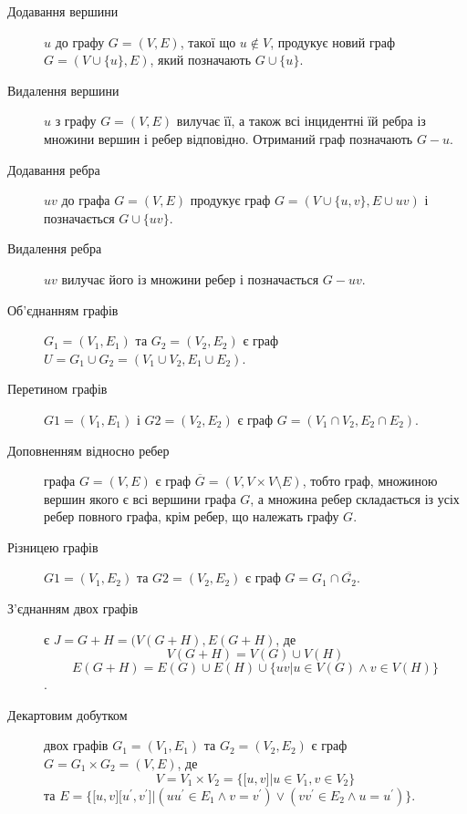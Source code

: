 \begin{description}
\item[Додавання вершини] $u$ до графу $G=(V,E)$, такої що $u \not\in V$, продукує новий граф $G=(V \cup \lbrace u \rbrace,E)$, який позначають $G \cup \lbrace u \rbrace$.
\item[Видалення вершини] $u$ з графу $G=(V,E)$ вилучає її, а також всі інцидентні їй ребра із множини вершин і ребер відповідно. Отриманий граф позначають $G-u$.
\item[Додавання ребра] $uv$ до графа $G=(V,E)$ продукує граф $G=(V \cup \lbrace u,v \rbrace, E \cup uv)$ і позначається $G \cup \lbrace uv \rbrace$.
\item[Видалення ребра] $uv$ вилучає його із множини ребер і позначається $G-uv$.
\item[Об'єднанням графів] $G_1=(V_1,E_1)$ та $G_2=(V_2,E_2)$ є граф $U=G_1 \cup G_2=(V_1 \cup V_2,E_1 \cup E_2)$.
\item[Перетином графів] $G1=(V_1,E_1)$ і $G2=(V_2,E_2)$ є граф $G=(V_1 \cap V_2, E_2 \cap E_2)$.
\item[Доповненням відносно ребер] графа $G=(V,E)$ є граф $\overline G=(V,V \times V \setminus E)$, тобто граф, множиною вершин якого є всі вершини графа $G$, а множина ребер складається із усіх ребер повного графа, крім ребер, що належать графу $G$.
\item[Різницею графів] $G1=(V_1,E_2)$ та $G2=(V_2,E_2)$ є граф $G=G_1 \cap \overline{G_2}$.
\item[З'єднанням двох графів] є $J=G+H=(V(G+H),E(G+H)$, де $$V(G+H)=V(G) \cup V(H)$$ $$E(G+H)=E(G) \cup E(H) \cup \lbrace uv \vert u \in V(G) \land v \in V(H) \rbrace$$.
\item[Декартовим добутком] двох графів $G_1=(V_1,E_1)$ та $G_2=(V_2,E_2)$ є граф $G=G_1 \times G_2=(V,E)$, де $$V=V_1 \times V_2=\lbrace \lbrack u,v \rbrack \vert u \in V_1, v \in V_2 \rbrace$$ та $E=\lbrace \lbrack u,v \rbrack \lbrack u^\prime,v^\prime \rbrack \vert (uu^\prime \in E_1 \land v=v^\prime) \lor (vv^\prime \in E_2 \land u=u^\prime) \rbrace$.
\end{description}

